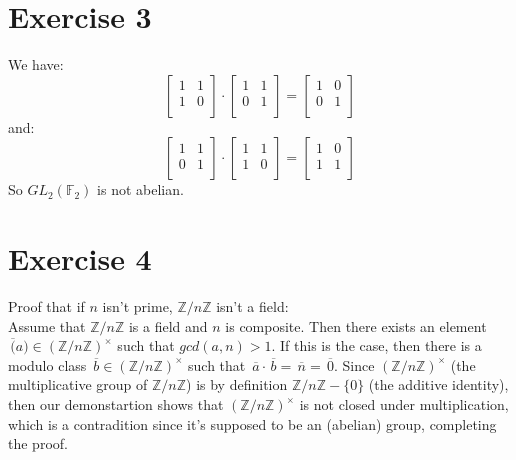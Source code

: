\documentclass[12pt]{article}
\newcommand{\Z}{\mathbb{Z}}
\newcommand{\F}{\mathbb{F}}
\newcommand{\olsi}[1]{\,\overline{\!{#1}}}
\begin{document}
    \section*{Exercise 3}
    We have:
    \[ \begin{bmatrix}
        1 & 1 \\
        1 & 0 \\
    \end{bmatrix} \cdot
    \begin{bmatrix}
        1 & 1 \\
        0 & 1 \\
    \end{bmatrix}
    = \begin{bmatrix}
        1 & 0 \\
        0 & 1 \\
    \end{bmatrix} \]
    and: 
    \[ \begin{bmatrix}
        1 & 1 \\
        0 & 1 \\
    \end{bmatrix} \cdot
    \begin{bmatrix}
        1 & 1 \\
        1 & 0 \\
    \end{bmatrix}
    = \begin{bmatrix}
        1 & 0 \\
        1 & 1 \\
    \end{bmatrix} \]
    So $GL_2(\F_2)$ is not abelian.


    \section*{Exercise 4}
    Proof that if $n$ isn't prime, $\Z/n\Z$ isn't a field: \\
    Assume that $\Z/n\Z$ is a field and $n$ is composite.
    Then there exists an element $\olsi(a) \in (\Z/n\Z)^\times$
    such that $gcd(a, n) > 1$.
    If this is the case,
    then there is a modulo class $\olsi{b} \in (\Z/n\Z)^\times$
    such that $\olsi{a} \cdot \olsi{b} = \olsi{n} = \olsi{0}$.
    Since $(\Z/n\Z)^\times$ (the multiplicative group of $\Z/n\Z$)
    is by definition $\Z/n\Z - \{0\}$ (the additive identity),
    then our demonstartion shows that $(\Z/n\Z)^\times$ is not closed
    under multiplication, which is a contradition since it's supposed to
    be an (abelian) group, completing the proof.
\end{document}
